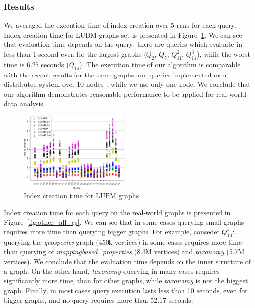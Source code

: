 \subsubsection{Results}

We averaged the execution time of index creation over 5 runs for each query.
Index creation time for LUBM graphs set is presented in Figure~\ref{fig:lubm_all_qs}.
We can see that evaluation time depends on the query: there are queries which evaluate in less than 1 second even for the largest graphs ($Q_2$, $Q_5$, $Q_{11}^2$, $Q_{11}^3$), while the worst time is 6.26 seconds ($Q_{14}$).
The execution time of our algorithm is comparable with the recent results for the same graphs and queries implemented on a distributed system over 10 nodes~\cite{Wang2019}, while we use only one node.
We conclude that our algorithm demonstrates reasonable performance to be applied for real-world data analysis.

\begin{figure}
   \includegraphics[width=0.48\textwidth]{data/LUBM_all.pdf}
   \caption{Index creation time for LUBM graphs}
   \label{fig:lubm_all_qs}
\end{figure}

Index creation time for each query on the real-world graphs is presented in Figure~\ref{fig:other_all_qs}.
We can see that in some cases querying small graphs requires more time than querying bigger graphs.
For example, conseder $Q_{10}^4$: querying the \textit{geospecies} graph (450k vertices) in some cases requires more time than querying of \textit{mappingbased\_properties} (8.3M vertices) and \textit{taxonomy} (5.7M vertices).
We conclude that the evaluation time depends on the inner structure of a graph.
On the other hand, \textit{taxonomy} querying in many cases requires significantly more time, than for other graphs, while \textit{taxonomy} is not the biggest graph.
Finally, in most cases query execution lasts less than 10 seconds, even for bigger graphs, and no query requires more than 52.17 seconds.

